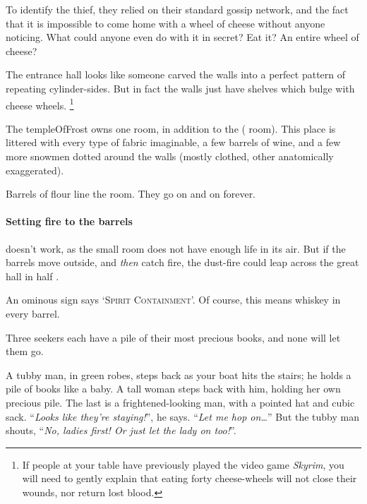 \begin{multicols}{2}
\begin{exampletext}
  To identify the thief, they relied on their standard gossip network, and the fact that it is impossible to come home with a wheel of cheese without anyone noticing.
  What could anyone even do with it in secret?
  Eat it?
  An entire wheel of cheese?
\end{exampletext}

The entrance hall looks like someone carved the walls into a perfect pattern of repeating cylinder-sides.
But in fact the walls just have shelves which bulge with cheese wheels.%
\footnote{If people at your table have previously played the video game \textit{Skyrim}, you will need to gently explain that eating forty cheese-wheels will not close their wounds, nor return lost blood.}


The \gls{templeOfFrost} owns one room, in addition to the  ( room).
This place is littered with every type of fabric imaginable, a few barrels of wine, and a few more snowmen dotted around the walls (mostly clothed, other anatomically exaggerated).


Barrels of flour line the room.
They go on and on forever.

\paragraph{Setting fire to the barrels}
doesn't work, as the small room does not have enough life in its air.
But if the barrels move outside, and \emph{then} catch fire, the dust-fire could leap across the great hall in half .


An ominous sign says `\textsc{Spirit Containment}'.
Of course, this means whiskey in every barrel.



Three \glspl{seeker} each have a pile of their most precious books, and none will let them go.

\begin{boxtext}
  A tubby man, in green robes, steps back as your boat hits the stairs; he holds a pile of books like a baby.
  A tall woman steps back with him, holding her own precious pile.
  The last is a frightened-looking man, with a pointed hat and cubic sack.
  ``\textit{Looks like they're staying!}'', he says.
  ``\textit{Let me hop on\ldots}''
  But the tubby man shouts, ``\textit{No, ladies first!
  Or just let the lady on too!}''.


\end{boxtext}
\end{multicols}
